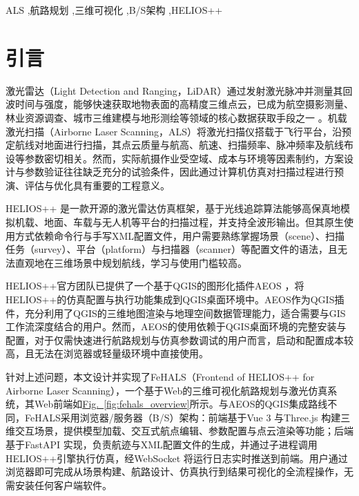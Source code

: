 \documentclass[a4paper,fleqn]{cas-sc}
\newcommand{\refFig}[1]{\hyperref[#1]{Fig.~\ref*{#1}}}
\begin{document}
\begin{keywords}
    ALS \sep 航路规划 \sep 三维可视化 \sep B/S架构 \sep HELIOS++
\end{keywords}

\MakeNJFUTitlePage[UseDocTitle]
\maketitle
\tableofcontents
\hrulefill

\section{引言}
激光雷达（Light Detection and Ranging，LiDAR）通过发射激光脉冲并测量其回波时间与强度，能够快速获取地物表面的高精度三维点云，已成为航空摄影测量、林业资源调查、城市三维建模与地形测绘等领域的核心数据获取手段之一 \citep{laserRemoteSensing}。机载激光扫描（Airborne Laser Scanning，ALS）将激光扫描仪搭载于飞行平台，沿预定航线对地面进行扫描，其点云质量与航高、航速、扫描频率、脉冲频率及航线布设等参数密切相关。然而，实际航摄作业受空域、成本与环境等因素制约，方案设计与参数验证往往缺乏充分的试验条件，因此通过计算机仿真对扫描过程进行预演、评估与优化具有重要的工程意义。

HELIOS++ \citep{heliosPlusPlus} 是一款开源的激光雷达仿真框架，基于光线追踪算法能够高保真地模拟机载、地面、车载与无人机等平台的扫描过程，并支持全波形输出。但其原生使用方式依赖命令行与手写XML配置文件，用户需要熟练掌握场景（scene）、扫描任务（survey）、平台（platform）与扫描器（scanner）等配置文件的语法，且无法直观地在三维场景中规划航线，学习与使用门槛较高。

HELIOS++官方团队已提供了一个基于QGIS的图形化插件AEOS \citep{aeos}，将HELIOS++的仿真配置与执行功能集成到QGIS桌面环境中。AEOS作为QGIS插件，充分利用了QGIS的三维地图渲染与地理空间数据管理能力，适合需要与GIS工作流深度结合的用户。然而，AEOS的使用依赖于QGIS桌面环境的完整安装与配置，对于仅需快速进行航路规划与仿真参数调试的用户而言，启动和配置成本较高，且无法在浏览器或轻量级环境中直接使用。

针对上述问题，本文设计并实现了FeHALS（Frontend of HELIOS++ for Airborne Laser Scanning），一个基于Web的三维可视化航路规划与激光仿真系统，其Web前端如\refFig{fig:fehals_overview}所示。与AEOS的QGIS集成路线不同，FeHALS采用浏览器/服务器（B/S）架构：前端基于Vue 3 \citep{vuejs} 与Three.js \citep{threejs} 构建三维交互场景，提供模型加载、交互式航点编辑、参数配置与点云渲染等功能；后端基于FastAPI \citep{fastapi} 实现，负责航迹与XML配置文件的生成，并通过子进程调用HELIOS++引擎执行仿真，经WebSocket \citep{WebSocket} 将运行日志实时推送到前端。用户通过浏览器即可完成从场景构建、航路设计、仿真执行到结果可视化的全流程操作，无需安装任何客户端软件。
\end{document}
